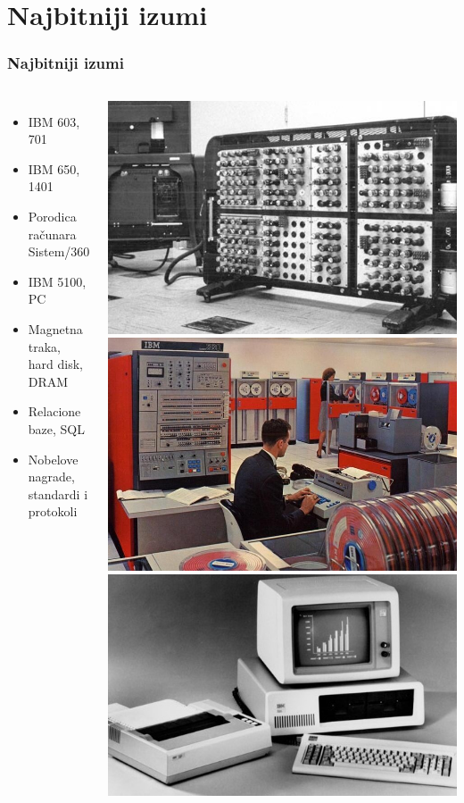 \documentclass{beamer}
\begin{document}
\section{Najbitniji izumi}
\begin{frame}[fragile]\frametitle{Najbitniji izumi}
\begin{columns}
	\begin{itemize}	
	\setlength{\itemindent}{3em}
		\item IBM 603, 701
		\item IBM 650, 1401	
		\item Porodica računara Sistem/360
		\item IBM 5100, PC
		\item Magnetna traka, hard disk, DRAM
		\item Relacione baze, SQL
		\item Nobelove nagrade, standardi i protokoli
		\end{itemize}
		\includegraphics[width=0.77\linewidth]{ibm603.jpg}
  \label{fig:1}
  \includegraphics[width=0.77\linewidth]{sys360.jpg}
  \label{fig:2}
  \includegraphics[width=0.77\linewidth]{ibmpc2.jpg}
  \label{fig:3}
\end{columns}
\end{frame}
\end{document}
